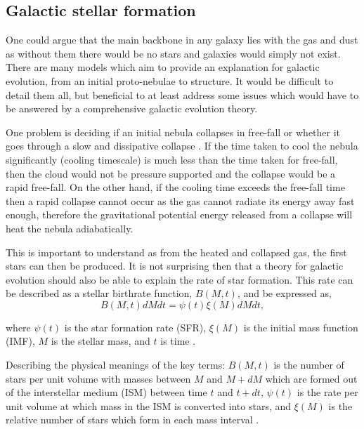 \documentclass[12pt, twocolumn]{revtex4-1}    %
\begin{document}
\subsection*{Galactic stellar formation}


One could argue that the main backbone in any galaxy lies with the gas and dust as without them there would be no stars and galaxies would simply not exist. There are many models which aim to provide an explanation for galactic evolution, from an initial proto-nebulae to structure. It would be difficult to detail them all, but beneficial to at least address some issues which would have to be answered by a comprehensive galactic evolution theory. 

One problem is deciding if an initial nebula collapses in free-fall or whether it goes through a slow and dissipative collapse \citep{carroll_astro}. If the time taken to cool the nebula significantly (cooling timescale) is much less than the time taken for free-fall, then the cloud would not be pressure supported and the collapse would be a rapid free-fall. On the other hand, if the cooling time exceeds the free-fall time then a rapid collapse cannot occur as the gas cannot radiate its energy away fast enough, therefore the gravitational potential energy released from a collapse will heat the nebula adiabatically. 

This is important to understand as from the heated and collapsed gas, the first stars can then be produced. It is not surprising then that a theory for galactic evolution should also be able to explain the rate of star formation. This rate can be described as a stellar birthrate function, $B(M,t)$, and be expressed as,
\begin{equation}
B(M,t)dM dt = \psi (t) \xi (M) dM dt, 
\label{eqn:stellar_birth_rate}
\end{equation}

where $\psi(t)$ is the star formation rate (SFR), $\xi (M)$ is the initial mass function (IMF), $M$ is the stellar mass, and $t$ is time \citep{carroll_astro}. 

Describing the physical meanings of the key terms: $B(M,t)$ is the number of stars per unit volume with masses between $M$ and $M+dM$ which are formed out of the interstellar medium (ISM) between time $t$ and $t+dt$, $\psi(t)$ is the rate per unit volume at which mass in the ISM is converted into stars, and $\xi(M)$ is the relative number of stars which form in each mass interval \citep{carroll_astro}. 
\end{document}
